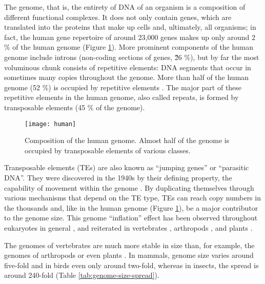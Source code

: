 The genome, that is, the entirety of DNA of an organism is a composition
of different functional complexes. It does not only contain genes, which
are translated into the proteins that make up cells and, ultimately, all
organisms; in fact, the human gene repertoire of around 23,000 genes
makes up only around 2 \% of the human genome \citep{Makalowski2001}
(Figure \ref{fig:human-genome}). More prominent components of the human
genome include introns (non-coding sections of genes, \~26 \%), but by
far the most voluminous chunk consists of repetitive elements: DNA
segments that occur in sometimes many copies throughout the genome.
More than half of the human genome (52 \%) is occupied by repetitive
elements \citep{Lander2001}.  The major part of these repetitive
elements in the human genome, also called repeats, is formed by
transposable elements (45 \% of the genome).

\begin{figure}
\centering
\texttt{[image: human]}
\caption{Composition of the human genome. Almost half of the genome is
occupied by transposable elements of various classes.}
\label{fig:human-genome}
\end{figure}

Transposable elements (TEs) are also known as ``jumping genes'' or
``parasitic DNA''. They were discovered in the 1940s by their defining
property, the capability of movement within the genome
\citep{McClintock1950}. By duplicating themselves through various
mechanisms that depend on the TE type, TEs can reach copy numbers in the
thousands \citep{Petersen2018} and, like in the human genome (Figure
\ref{fig:human-genome}), be a major contributor to the genome size. This
genome ``inflation'' effect has been observed throughout eukaryotes in
general \citep{Chenais2012}, and reiterated in vertebrates
\citep{Chalopin2015}, arthropods \citep{Petersen2018}, and plants
\citep{Staton2015}. 

The genomes of vertebrates are much more stable in size than, for
example, the genomes of arthropods or even plants \citep{Gregory2005}.
In mammals, genome size varies around five-fold and in birds even only
around two-fold, whereas in insects, the spread is around 240-fold
(Table \ref{tab:genome-size-spread}).


